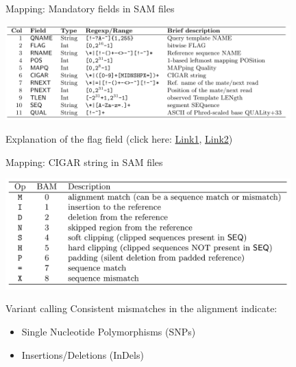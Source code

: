 \documentclass[presentation]{beamer}
\begin{document}
\begin{frame}[label=sec-3-1-9]{Mapping: Mandatory fields in SAM files}
\begin{center}

\includegraphics[width=11cm]{SamFields.png}

\normalsize{}

Explanation of the flag field (click here: \href{https://ppotato.wordpress.com/2010/08/25/samtool-bitwise-flag-paired-reads/}{Link1}, \href{http://broadinstitute.github.io/picard/explain-flags.html}{Link2})

\end{center}
\end{frame}

\begin{frame}[label=sec-3-1-10]{Mapping: CIGAR string in SAM files}
\begin{center}

\includegraphics[width=11cm]{CIGAR.png}


\end{center}
\end{frame}


\begin{frame}[label=sec-3-1-11]{Variant calling}
Consistent mismatches in the alignment indicate:
\begin{itemize}
\item Single Nucleotide Polymorphisms (SNPs)
\item Insertions/Deletions (InDels)
\end{itemize}
\end{frame}
\end{document}
